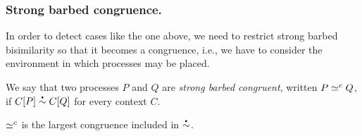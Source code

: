 \documentclass[runningheads]{llncs}
\begin{document}




\subsubsection{Strong barbed congruence.}
In order to detect cases like the one above, we need to restrict strong barbed bisimilarity so that it becomes a congruence,
i.e., %
we have to consider the environment in which processes may be placed.

We say that two processes \( P \) and \( Q \) are \emph{strong barbed congruent}, written \( P \simeq^c Q \), if \( \sbbisim{\applyctx{C}{P}}{\applyctx{C}{Q}} \) for every context \( C \).

\begin{lemma}\label{lemma:sbcong-largest}
  \( \simeq^c \) is the largest congruence included in
  \( \sbbisim{}{} \).
\end{lemma}
\end{document}
